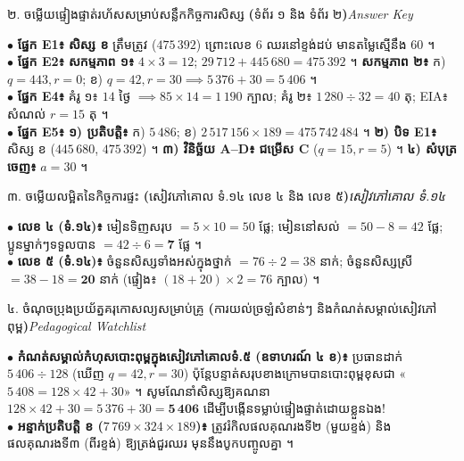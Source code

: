 \documentclass[a4paper,10pt]{article}
\newcommand{\en}[1]{{\TimesEn #1}}
\newcommand{\enbf}[1]{{\TimesEn\bfseries #1}}
\newcommand{\secstrip}[2]{%
  \vspace{3pt}%
  \begin{tcolorbox}[
    enhanced, sharp corners, colback=panelgray, colframe=black,
    boxrule=0.8pt, boxsep=0.8pt, top=2pt, bottom=2pt, left=5pt, right=5pt,
    after skip=3pt
  ]
    {\muol\fontsize{8.5pt}{12.2pt}\selectfont #1}\hfill{\fontsize{7.8pt}{10.8pt}\selectfont\textit{#2}}
  \end{tcolorbox}%
}
\begin{document}
\vfill
\secstrip{២. ចម្លើយផ្ទៀងផ្ទាត់រហ័សសម្រាប់សន្លឹកកិច្ចការសិស្ស \enbf{(}ទំព័រ ១ និង ទំព័រ ២\enbf{)}}{\en{Answer Key}}

\begin{tcolorbox}[
  enhanced, sharp corners, colback=white, colframe=black,
  boxrule=0.8pt, boxsep=2.5pt, top=4.5pt, bottom=4.5pt, left=6pt, right=6pt
]
  \fontsize{9.0pt}{13.5pt}\selectfont
  $\bullet$ \textbf{ផ្នែក \en{E1}៖} \textbf{សិស្ស ខ} ត្រឹមត្រូវ ($475\,392$) ព្រោះលេខ $6$ ឈរនៅខ្ទង់ដប់ មានតម្លៃស្មើនឹង $60$ ។\\[2pt]
  $\bullet$ \textbf{ផ្នែក \en{E2}៖} \textbf{សកម្មភាព ១៖} $4\times 3 = 12$; $29\,712 + 445\,680 = 475\,392$ ។ \textbf{សកម្មភាព ២៖} ក) $q=443, r=0$; ខ) $q=42, r=30 \implies 5\,376 + 30 = 5\,406$ ។\\[2pt]
  $\bullet$ \textbf{ផ្នែក \en{E4}៖} គំរូ ១៖ $14$ ថ្ងៃ $\implies 85 \times 14 = 1\,190$ ក្បាល; គំរូ ២៖ $1\,280 \div 32 = 40$ តុ; \en{EIA}៖ សំណល់ $r = 15$ តុ ។\\[2pt]
  $\bullet$ \textbf{ផ្នែក \en{E5}៖} \textbf{១) ប្រតិបត្តិ៖} ក) $5\,486$; ខ) $2\,517\,156 \times 189 = 475\,742\,484$ ។ \textbf{២) បិទ \en{E1}៖} សិស្ស ខ ($445\,680$, $475\,392$) ។ \textbf{៣) វិនិច្ឆ័យ \en{A--D}៖} \textbf{ជម្រើស \en{C}} ($q=15, r=5$) ។ \textbf{៤) សំបុត្រចេញ៖} $a = 30$ ។
\end{tcolorbox}

\vfill
\secstrip{៣. ចម្លើយលម្អិតនៃកិច្ចការផ្ទះ \enbf{(}សៀវភៅគោល ទំ.១៤ លេខ ៤ និង លេខ ៥\enbf{)}}{សៀវភៅគោល ទំ.១៤}

\begin{tcolorbox}[
  enhanced, sharp corners, colback=white, colframe=black,
  boxrule=0.8pt, boxsep=2.5pt, top=4.5pt, bottom=4.5pt, left=6pt, right=6pt
]
  \fontsize{8.9pt}{13.3pt}\selectfont
  $\bullet$ \textbf{លេខ ៤ (ទំ.១៤)៖} មៀនទិញសរុប $= 5 \times 10 = 50$ ផ្លែ; មៀននៅសល់ $= 50 - 8 = 42$ ផ្លែ; ប្អូនម្នាក់ៗទទួលបាន $= 42 \div 6 = \mathbf{7\text{ ផ្លែ}}$ ។\\[2pt]
  $\bullet$ \textbf{លេខ ៥ (ទំ.១៤)៖} ចំនួនសិស្សទាំងអស់ក្នុងថ្នាក់ $= 76 \div 2 = 38$ នាក់; ចំនួនសិស្សស្រី $= 38 - 18 = \mathbf{20\text{ នាក់}}$ (ផ្ទៀង៖ $(18+20)\times 2 = 76$ ក្បាល) ។
\end{tcolorbox}

\vfill
\secstrip{៤. ចំណុចប្រុងប្រយ័ត្នគរុកោសល្យសម្រាប់គ្រូ \enbf{(}ការយល់ច្រឡំសំខាន់ៗ និងកំណត់សម្គាល់សៀវភៅពុម្ព\enbf{)}}{\en{Pedagogical Watchlist}}

\begin{tcolorbox}[
  enhanced, sharp corners, colback=panelgray, colframe=black,
  boxrule=0.85pt, boxsep=2.5pt, top=4.5pt, bottom=4.5pt, left=6pt, right=6pt
]
  \fontsize{8.8pt}{13.1pt}\selectfont
  $\bullet$ \textbf{កំណត់សម្គាល់កំហុសបោះពុម្ពក្នុងសៀវភៅគោលទំ.៥ (ឧទាហរណ៍ ៤ ខ)៖} ប្រធានដាក់ $5\,406 \div 128$ (ឃើញ $q=42, r=30$) ប៉ុន្តែបន្ទាត់សរុបខាងក្រោមបានបោះពុម្ពខុសជា «$5\,408 = 128 \times 42 + 30$» ។ សូមណែនាំសិស្សឱ្យគណនា $128 \times 42 + 30 = 5\,376 + 30 = \mathbf{5\,406}$ ដើម្បីបង្កើនទម្លាប់ផ្ទៀងផ្ទាត់ដោយខ្លួនឯង!\\[2pt]
  $\bullet$ \textbf{អន្ទាក់ប្រតិបត្តិ ខ ($7\,769 \times 324 \times 189$)៖} ត្រូវរំកិលផលគុណរងទី២ (មួយខ្ទង់) និងផលគុណរងទី៣ (ពីរខ្ទង់) ឱ្យត្រង់ជួរឈរ មុននឹងបូកបញ្ចូលគ្នា ។
\end{tcolorbox}
\end{document}
